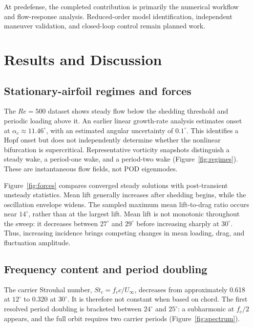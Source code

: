 At predefense, the completed contribution is primarily the numerical workflow and flow-response analysis. Reduced-order model identification, independent maneuver validation, and closed-loop control remain planned work. 

\section{Results and Discussion}
\subsection{Stationary-airfoil regimes and forces}
The $Re=500$ dataset shows steady flow below the shedding threshold and periodic loading above it. An earlier linear growth-rate analysis estimates onset at $\alpha_c\approx11.46^\circ$, with an estimated angular uncertainty of $0.1^\circ$. This identifies a Hopf onset but does not independently determine whether the nonlinear bifurcation is supercritical. Representative vorticity snapshots distinguish a steady wake, a period-one wake, and a period-two wake (Figure~\ref{fig:regimes}). These are instantaneous flow fields, not POD eigenmodes.


Figure~\ref{fig:forces} compares converged steady solutions with post-transient unsteady statistics. Mean lift generally increases after shedding begins, while the oscillation envelope widens. The sampled maximum mean lift-to-drag ratio occurs near $14^\circ$, rather than at the largest lift. Mean lift is not monotonic throughout the sweep: it decreases between $27^\circ$ and $29^\circ$ before increasing sharply at $30^\circ$. Thus, increasing incidence brings competing changes in mean loading, drag, and fluctuation amplitude.


\subsection{Frequency content and period doubling}
The carrier Strouhal number, $St_c=f_cc/U_\infty$, decreases from approximately 0.618 at $12^\circ$ to 0.320 at $30^\circ$. It is therefore not constant when based on chord. The first resolved period doubling is bracketed between $24^\circ$ and $25^\circ$: a subharmonic at $f_c/2$ appears, and the full orbit requires two carrier periods (Figure~\ref{fig:spectrum}).

